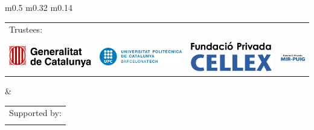 \documentclass[a0paper,portrait]{baposter}
\begin{document}
\begin{poster}
{\begin{center}
\begin{tabular}{m{} m{} m{}}
\begin{tabular}{llll}
\multicolumn{4}{l}{\color{icfoblue} \small Trustees: }
\\ \arrayrulecolor{icfoblue}\hline
&&& \\[-2mm]
\includegraphics[height=\logoheight]{Logos/GeneralitatDeCatalunya.png} & \hspace{2mm}
\includegraphics[height=\logoheight]{Logos/UPC.png} & \hspace{2mm}
\includegraphics[height=\logoheight]{Logos/Fundacio-CELLEX.png} & \hspace{2mm}
\includegraphics[height=\logoheight]{Logos/Fundacio-Mir-Puig.png} 
\end{tabular}
&
%
%
\begin{tabular}{llll}
\multicolumn{4}{l}{\color{icfoblue} \small Supported by: }
\\ \arrayrulecolor{icfoblue}\hline
&&& \\[-2mm]

\end{tabular}
\end{tabular}
\end{center}}
\end{poster}
\end{document}
